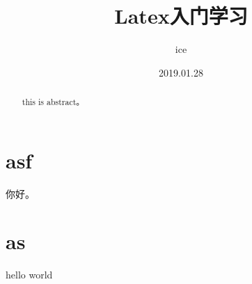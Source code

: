 \documentclass{article}
\author{ ice }
\date {2019.01.28}
\title{Latex入门学习}
\begin{document}
\maketitle
\begin{center}
\end{center}

\tableofcontents %

\tableofcontents 

\begin{abstract}
this is abstract。
\end{abstract}

\section{asf}
你好。

\section{as}
hello world  


% 

\end{document}
